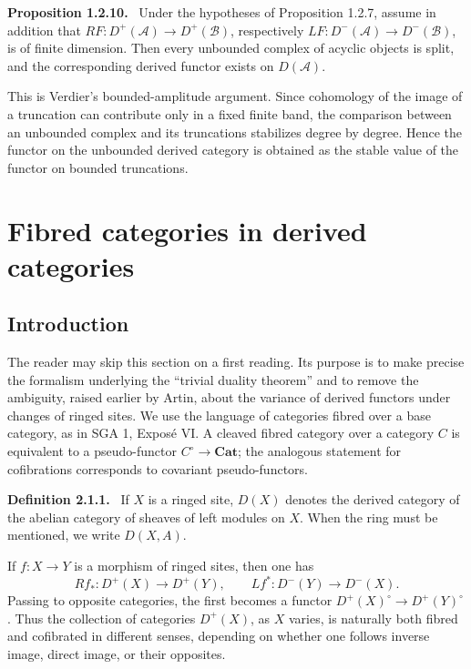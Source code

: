 \documentclass[12pt]{article}
\newcommand{\A}{\mathcal{A}}
\newcommand{\B}{\mathcal{B}}
\newenvironment{statement}[1]{\par\medskip\noindent\textbf{#1.}\ }{\par\medskip}
\begin{document}
\begin{statement}{Proposition 1.2.10}
Under the hypotheses of Proposition 1.2.7, assume in addition that \(RF:D^+(\A)\to D^+(\B)\), respectively \(LF:D^-(\A)\to D^-(\B)\), is of finite dimension. Then every unbounded complex of acyclic objects is split, and the corresponding derived functor exists on \(D(\A)\).
\end{statement}

This is Verdier's bounded-amplitude argument. Since cohomology of the image of a truncation can contribute only in a fixed finite band, the comparison between an unbounded complex and its truncations stabilizes degree by degree. Hence the functor on the unbounded derived category is obtained as the stable value of the functor on bounded truncations.

\section{Fibred categories in derived categories}

\subsection{Introduction}

The reader may skip this section on a first reading. Its purpose is to make precise the formalism underlying the ``trivial duality theorem'' and to remove the ambiguity, raised earlier by Artin, about the variance of derived functors under changes of ringed sites. We use the language of categories fibred over a base category, as in SGA 1, Expos\'e VI. A cleaved fibred category over a category \(C\) is equivalent to a pseudo-functor \(C^{\circ}\to\mathbf{Cat}\); the analogous statement for cofibrations corresponds to covariant pseudo-functors.

\begin{statement}{Definition 2.1.1}
If \(X\) is a ringed site, \(D(X)\) denotes the derived category of the abelian category of sheaves of left modules on \(X\). When the ring must be mentioned, we write \(D(X,A)\).
\end{statement}

If \(f:X\to Y\) is a morphism of ringed sites, then one has
\[
Rf_*:D^+(X)\to D^+(Y),
\qquad
Lf^*:D^-(Y)\to D^-(X).
\]
Passing to opposite categories, the first becomes a functor \(D^+(X)^{\circ}\to D^+(Y)^{\circ}\). Thus the collection of categories \(D^+(X)\), as \(X\) varies, is naturally both fibred and cofibrated in different senses, depending on whether one follows inverse image, direct image, or their opposites.
\end{document}
